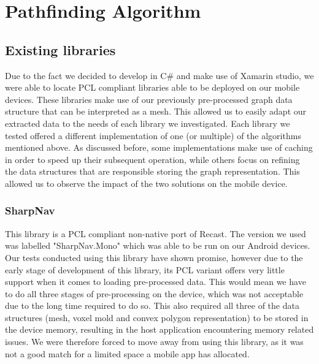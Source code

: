 \documentclass[12pt,a4paper]{report}
\begin{document}
\section{Pathfinding Algorithm}

\subsection{Existing libraries}
Due to the fact we decided to develop in C\# and make use of Xamarin studio, we were able to locate PCL compliant libraries able to be deployed on our mobile devices. These libraries make use of our previously pre-processed graph data structure that can be interpreted as a mesh. This allowed us to easily adapt our extracted data to the needs of each library we investigated. Each library we tested offered a different implementation of one (or multiple) of the algorithms mentioned above. As discussed before, some implementations make use of caching in order to speed up their subsequent operation, while others focus on refining the data structures that are responsible storing the graph representation. This allowed us to observe the impact of the two solutions on the mobile device.

\subsubsection{SharpNav}
This library\cite{libSharpnav} is a PCL compliant non-native port of Recast. The version we used was labelled "SharpNav.Mono" which was able to be run on our Android devices. Our tests conducted using this library have shown promise, however due to the early stage of development of this library, its PCL variant offers very little support when it comes to loading pre-processed data. This would mean we have to do all three stages of pre-processing on the device, which was not acceptable due to the long time required to do so. This also required all three of the data structures (mesh, voxel mold and convex polygon representation) to be stored in the device memory, resulting in the host application encountering memory related issues. We were therefore forced to move away from using this library, as it was not a good match for a limited space a mobile app has allocated.
\end{document}
